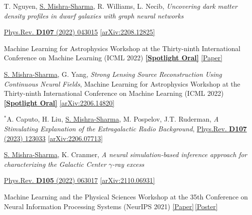 \documentclass[letterpaper,11pt]{article}
\newenvironment{packed_itemize}{
\begin{itemize}[label=\raisebox{0.25ex}{\tiny$\bullet$}]
  \setlength{\itemsep}{4.2pt}
  \setlength{\parskip}{0pt}
  \setlength{\parsep}{0pt}}{\end{itemize}
}
\newenvironment{packed_enumerate}[1][]{
\begin{etaremune}[#1]
  \setlength{\itemsep}{3.7pt}
  \setlength{\parskip}{0pt}
  \setlength{\parsep}{0pt}}{\end{etaremune}
}
\begin{document}
\begin{packed_enumerate}[start=37]
  \item T. Nguyen, \underline{S. Mishra-Sharma}, R. Williams, L. Necib, \emph{Uncovering dark matter density profiles in dwarf galaxies with graph neural networks}
  \begin{packed_itemize}
      \item {\href{https://journals.aps.org/prd/abstract/10.1103/PhysRevD.107.043015}{Phys.Rev. \textbf{D107} (2022) 043015}} \href{https://arxiv.org/abs/2208.12825}{[arXiv:2208.12825]}
      \item Machine Learning for Astrophysics Workshop at the Thirty-ninth International Conference on Machine Learning (ICML 2022) \href{https://ml4astro.github.io/icml2022/}{\textbf{[Spotlight Oral]}} \href{https://ml4astro.github.io/icml2022/assets/38.pdf}{[Paper]}
    \end{packed_itemize}
    
  \item \underline{S. Mishra-Sharma}, G. Yang, \emph{Strong Lensing Source Reconstruction Using Continuous Neural Fields}, {Machine Learning for Astrophysics Workshop at the Thirty-ninth International Conference on Machine Learning (ICML 2022)} \href{https://ml4astro.github.io/icml2022/}{\textbf{[Spotlight Oral]}} \href{https://arxiv.org/abs/2206.14820}{[arXiv:2206.14820]}
   

  \item $^*$A. Caputo, H. Liu, \underline{S. Mishra-Sharma}, M. Pospelov, J.T. Ruderman, \emph{A Stimulating Explanation of the Extragalactic Radio Background}, \href{https://journals.aps.org/prd/abstract/10.1103/PhysRevD.107.123033}{Phys.Rev. \textbf{D107} (2023) 123033} \href{https://arxiv.org/abs/2206.07713}{[arXiv:2206.07713]}

  \item  \underline{S. Mishra-Sharma}, K. Cranmer, \emph{A neural simulation-based inference approach for characterizing the Galactic Center $\gamma$-ray excess}
    \begin{packed_itemize}
      \item {\href{https://journals.aps.org/prd/abstract/10.1103/PhysRevD.105.063017}{Phys.Rev. \textbf{D105} (2022) 063017} \href{https://arxiv.org/abs/2110.06931}{[arXiv:2110.06931]}}
      \item {Machine Learning and the Physical Sciences Workshop at the 35th Conference on Neural Information Processing Systems (NeurIPS 2021) \href{https://ml4physicalsciences.github.io/2020/files/NeurIPS_ML4PS_2020_20.pdf}{[Paper]}\,\href{https://ml4physicalsciences.github.io/2020/files/NeurIPS_ML4PS_2020_20_poster.pdf}{[Poster]}}
    \end{packed_itemize}


\end{packed_enumerate}
\end{document}
